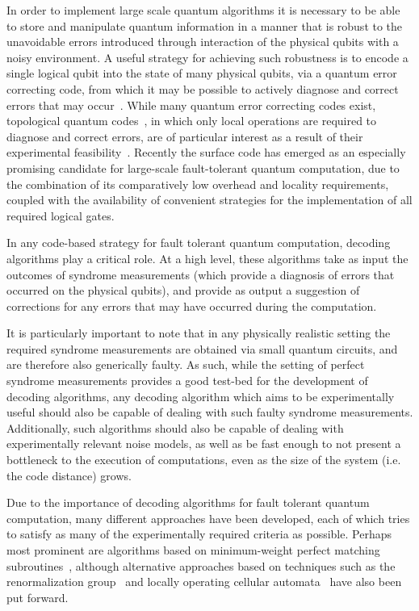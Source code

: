 \documentclass[twocolumn,preprintnumbers,amsmath,amssymb,notitlepage,nofootinbib,longbibliography,superscriptaddress,aps,pra,10pt]{revtex4-1}
\begin{document}
	In order to implement large scale quantum algorithms it is necessary to be able to store and manipulate quantum information in a manner that is robust to the unavoidable errors introduced through interaction of the physical qubits with a noisy environment.
	A useful strategy for achieving such robustness is to encode a single logical qubit into the state of many physical qubits, via a quantum error correcting code, from which it may be possible to actively diagnose and correct errors that may occur~\cite{Terhal15,Campbell17}.
	While many quantum error correcting codes exist, topological quantum codes~\cite{Kitaev03, Dennis02, Preskill17lectures, Nayak08, Pachos12, Terhal15, Brown16, Campbell17}, in which only local operations are required to diagnose and correct errors, are of particular interest as a result of their experimental feasibility~\cite{Reed12, Barends14, Nigg14, Corcoles15, Albrecht16, Takita16, Linke17}.
	Recently the surface code has emerged as an especially promising candidate for large-scale fault-tolerant quantum computation, due to the combination of its comparatively low overhead and locality requirements, coupled with the availability of convenient strategies for the implementation of all required logical gates.

	In any code-based strategy for fault tolerant quantum computation, decoding algorithms play a critical role.
	At a high level, these algorithms take as input the outcomes of syndrome measurements (which provide a diagnosis of errors that occurred on the physical qubits), and provide as output a suggestion of corrections for any errors that may have occurred during the computation.

	It is particularly important to note that in any physically realistic setting the required syndrome measurements are obtained via small quantum circuits, and are therefore also generically faulty.
	As such, while the setting of perfect syndrome measurements provides a good test-bed for the development of decoding algorithms, any decoding algorithm which aims to be experimentally useful should also be capable of dealing with such faulty syndrome measurements.
	Additionally, such algorithms should also be capable of dealing with experimentally relevant noise models, as well as be fast enough to not present a bottleneck to the execution of computations, even as the size of the system (i.e. the code distance) grows.

	Due to the importance of decoding algorithms for fault tolerant quantum computation, many different approaches have been developed, each of which tries to satisfy as many of the experimentally required criteria as possible.
	Perhaps most prominent are algorithms based on minimum-weight perfect matching subroutines~\cite{Fowler13}, although alternative approaches based on techniques such as the renormalization group~\cite{Duclos2010} and locally operating cellular automata~\cite{Herold15} have also been put forward.
\end{document}
